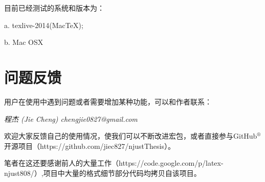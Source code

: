 目前已经测试的系统和版本为：

a. texlive-2014(MacTeX);

b. Mac OSX 

\section{问题反馈}

用户在使用中遇到问题或者需要增加某种功能，可以和作者联系：

{\it{程杰 (Jie Cheng) \quad chengjie0827@gmail.com}}

欢迎大家反馈自己的使用情况，使我们可以不断改进宏包，或者直接参与GitHub$^{\circledR}$开源项目（https://github.com/jiec827/njustThesis）。

笔者在这还要感谢前人的大量工作（https://code.google.com/p/latex-njust808/）,项目中大量的格式细节部分代码均拷贝自该项目。
